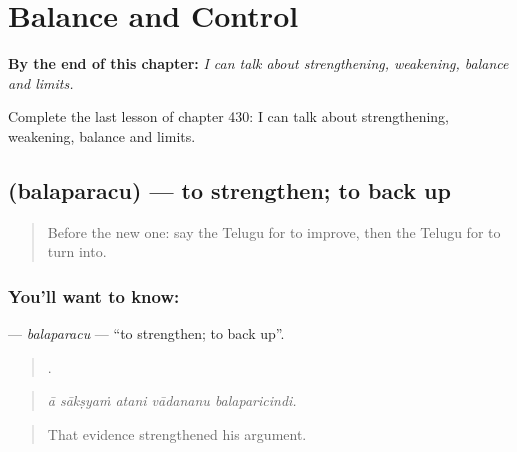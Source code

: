 
\chapter{Balance and Control}
\label{ch:te-balance-and-control}

\begin{chapteropening}
\textbf{By the end of this chapter:} \emph{I can talk about strengthening, weakening, balance and limits.}

Complete the last lesson of chapter 430: I can talk about strengthening, weakening, balance and limits.
\end{chapteropening}

\section[\texorpdfstring{\te{బలపరచు} (balaparacu)}{బలపరచు (balaparacu)}]{ (balaparacu) — to strengthen; to back up}

\label{lesson:TE-C430-balaparacu}



\begin{quote}
Before the new one: say the Telugu for to improve, then the Telugu for to turn into.
\end{quote}

\subsection*{You'll want to know: }
\textbf{} — \emph{balaparacu} — \textquotedblleft{}to strengthen; to back up\textquotedblright{}.

\begin{quote}
    .
\end{quote}

\begin{quote}
\emph{ā sākṣyaṁ atani vādananu balaparicindi.}
\end{quote}

\begin{quote}
That evidence strengthened his argument.
\end{quote}

